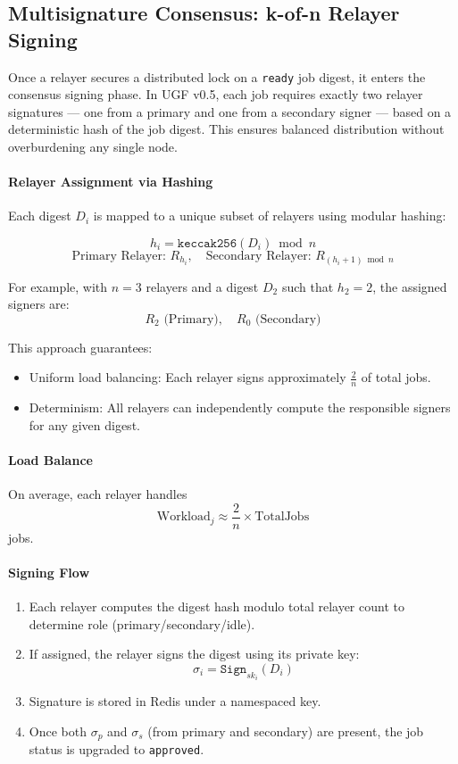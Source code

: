 \documentclass{article}
\begin{document}
\subsection{Multisignature Consensus: k-of-n Relayer Signing}

Once a relayer secures a distributed lock on a \texttt{ready} job digest, it enters the consensus signing phase. In UGF v0.5, each job requires exactly two relayer signatures — one from a primary and one from a secondary signer — based on a deterministic hash of the job digest. This ensures balanced distribution without overburdening any single node.

\paragraph{Relayer Assignment via Hashing}

Each digest \( D_i \) is mapped to a unique subset of relayers using modular hashing:

\[
h_i = \texttt{keccak256}(D_i) \bmod n
\]
\[
\text{Primary Relayer: } R_{h_i}, \quad \text{Secondary Relayer: } R_{(h_i + 1) \bmod n}
\]

For example, with \( n = 3 \) relayers and a digest \( D_2 \) such that \( h_2 = 2 \), the assigned signers are:
\[
R_2 \text{ (Primary)}, \quad R_0 \text{ (Secondary)}
\]

This approach guarantees:
\begin{itemize}
  \item Uniform load balancing: Each relayer signs approximately \( \frac{2}{n} \) of total jobs.
  \item Determinism: All relayers can independently compute the responsible signers for any given digest.
\end{itemize}

\paragraph{Load Balance}
On average, each relayer handles
\[
  \mathrm{Workload}_j \approx \frac{2}{n}\times\mathrm{TotalJobs}
\]
jobs.


\paragraph{Signing Flow}

\begin{enumerate}
  \item Each relayer computes the digest hash modulo total relayer count to determine role (primary/secondary/idle).
  \item If assigned, the relayer signs the digest using its private key:
  \[
  \sigma_i = \texttt{Sign}_{sk_i}(D_i)
  \]
  \item Signature is stored in Redis under a namespaced key.
  \item Once both \( \sigma_p \) and \( \sigma_s \) (from primary and secondary) are present, the job status is upgraded to \texttt{approved}.
\end{enumerate}
\end{document}
